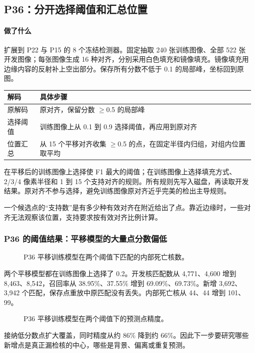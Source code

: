 \documentclass[
  12pt,
  fontset=fandol]{ctexart}
\newcounter{none} %
\begin{document}
\subsection{P36：分开选择阈值和汇总位置}\label{chapter20}
\paragraph{做了什么}
扩展到 P22 与 P15 的 8 个冻结检测器。固定抽取 240 张训练图像、全部 522 张开发图像；每张图像生成 16 种对齐，分别采用白色填充和镜像填充。镜像填充用边缘内容的反射补上空出部分。保存所有分数不低于 0.1 的局部峰，坐标回到原图。

{\def\LTcaptype{none}
\begin{longtable}[]{@{}
  >{\raggedright\arraybackslash}p{}
  >{\raggedright\arraybackslash}p{}@{}}
\toprule\noalign{}
解码 & 具体步骤\\
\midrule\noalign{}
\endhead
\bottomrule\noalign{}
\endlastfoot
原解码 & 原对齐，保留分数 \ensuremath{\geq}0.5 的局部峰\\
选择阈值 & 训练图像上从 0.1 到 0.9 选择阈值，再应用到原对齐\\
位置汇总 & 从 15 个平移对齐收集 \ensuremath{\geq}0.5 的点，在固定半径内归组，对组内位置取平均\\
\end{longtable}}
在平移后的训练图像上选择使 F1 最大的阈值；在训练图像上选择填充方式、2/3/4 像素半径和 1 到 15 个支持对齐的规则。所有规则先写入磁盘，再读取开发结果。原对齐不参与选择，避免训练图像原对齐近乎完美的检出主导规则。

一个候选点的“支持数”是有多少种有效对齐在附近给出了点。靠近边缘时，一些对齐无法观察该位置，支持要求按有效对齐比例计算。

\subsubsection{P36 的阈值结果：平移模型的大量点分数偏低}\label{chapter21}
\begin{figure}[H]\centering\caption{P36 平移训练模型在两个阈值下匹配的内部死亡核数。}\end{figure}
两个平移模型都在训练图像上选择了 0.2。开发核匹配数从 4,771、4,600 增到 8,463、8,542，召回率从 38.95\%、37.55\% 增到 69.09\%、69.73\%。新增 3,692、3,942 个匹配，保存点重放中原匹配没有丢失。内部死亡核从 44、44 增到 101、99。

\begin{figure}[H]\centering\caption{P36 平移训练模型在两个阈值下的预测点精度。}\end{figure}
接纳低分数点扩大覆盖，同时精度从约 86\% 降到约 66\%。因此下一步要研究哪些新增点是真正漏检核的中心，哪些是背景、偏离或重复预测。
\end{document}
